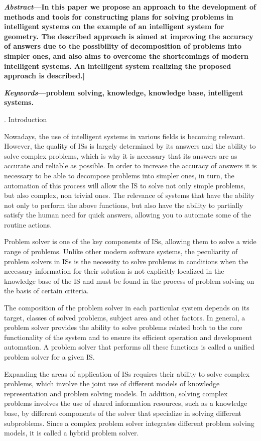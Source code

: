 \documentclass[10pt, a4paper]{article}
\newcommand{\RomanNumeralCaps}[1]{\MakeUppercase{\romannumeral#1}}
\begin{document}
\begin{multicols}{2}
\textbf{\textit{Abstract}—In this paper we propose an approach to the development of methods and tools for constructing plans for solving problems in intelligent systems on the example of an intelligent system for geometry. The described approach is aimed at improving the accuracy of answers due to the possibility of decomposition of problems into simpler ones, and also aims to overcome the shortcomings of modern intelligent systems. An intelligent system realizing the proposed approach is described.]}
 \par \textbf{\textit{Keywords}—problem solving, knowledge, knowledge base, intelligent systems.}
 \begin{center}
    \RomanNumeralCaps{1.}  Introduction
 \end{center}
  \par Nowadays, the use of intelligent systems in various fields is becoming relevant. However, the quality of ISs is largely determined by its answers and the ability to solve complex problems, which is why it is necessary that its answers are as accurate and reliable as possible. In order to increase the accuracy of answers it is necessary to be able to decompose problems into simpler ones, in turn, the automation of this process will allow the IS to solve not only simple problems, but also complex, non trivial ones. The relevance of systems that have the ability not only to perform the above functions, but also have the ability to partially satisfy the human need for quick answers, allowing you to automate some of the routine actions.
\par Problem solver is one of the key components of ISs, allowing them to solve a wide range of problems. Unlike other modern software systems, the peculiarity of problem solvers in ISs is the necessity to solve problems in conditions when the necessary information for their solution is not explicitly localized in the knowledge base of the IS and must be found in the process of problem solving on the basis of certain criteria.
\par The composition of the problem solver in each particular system depends on its target, classes of solved problems, subject area and other factors. In general, a problem solver provides the ability to solve problems related both to the core functionality of the system and to ensure its efficient operation and development automation. A problem solver that performs all these functions is called a unified problem solver for a given IS.
\par Expanding the areas of application of ISs requires their ability to solve complex problems, which involve the joint use of different models of knowledge representation and problem solving models. In addition, solving complex problems involves the use of shared information resources, such as a knowledge base, by different components of the solver that specialize in solving different subproblems. Since a complex problem solver integrates different problem solving models, it is called a hybrid problem solver.

\end{multicols}
\end{document}
